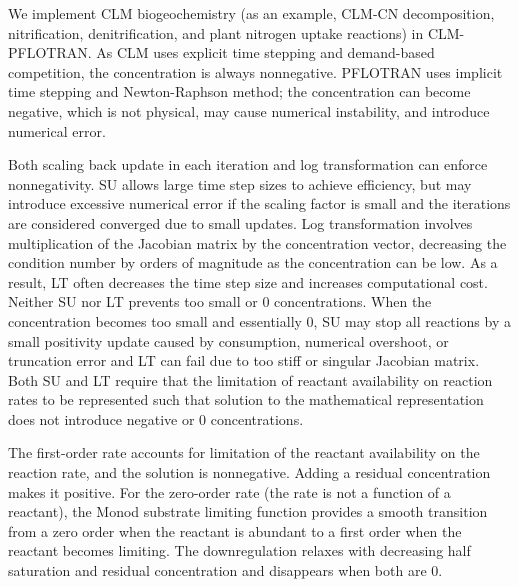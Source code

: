 \documentclass[gmd, manuscript]{copernicus}
\begin{document}
  

%

We implement CLM biogeochemistry (as an example, CLM-CN decomposition,
nitrification, denitrification, and plant nitrogen uptake reactions) in CLM-PFLOTRAN. As
CLM uses explicit time stepping and demand-based
competition, the concentration is always nonnegative. PFLOTRAN uses implicit
time stepping and Newton-Raphson method; the
concentration can become negative, which is not physical, may cause numerical
instability, and introduce numerical error. 

Both scaling back update in each iteration and log transformation can enforce
nonnegativity. SU allows large time step sizes to achieve efficiency, but may
introduce excessive numerical error if the scaling factor is small and the
iterations are considered converged due to small updates. Log transformation
involves multiplication of the Jacobian matrix by the concentration vector,
decreasing the condition number by orders of magnitude as the concentration can
be low. As a result, LT often decreases the time step size and increases
computational cost. Neither SU nor LT prevents too small or 0 concentrations.
When the concentration becomes too small and essentially 0, SU may stop all
reactions by a small positivity update caused by consumption, numerical
overshoot, or truncation error and LT can fail due to too stiff or singular
Jacobian matrix. Both SU and LT require that the limitation of reactant
availability on reaction rates to be represented such that solution to the
mathematical representation does not introduce negative or 0 concentrations.

The first-order rate accounts for
limitation of the reactant availability on the reaction rate, and the solution
is nonnegative. Adding a residual concentration makes it positive. For the
zero-order rate (the rate is not a function of a reactant), the Monod
substrate limiting function provides a smooth transition from a zero order when
the reactant is abundant to a first order when the reactant becomes
limiting. The downregulation relaxes with decreasing half saturation and
residual concentration and disappears when both are 0.
\end{document}
